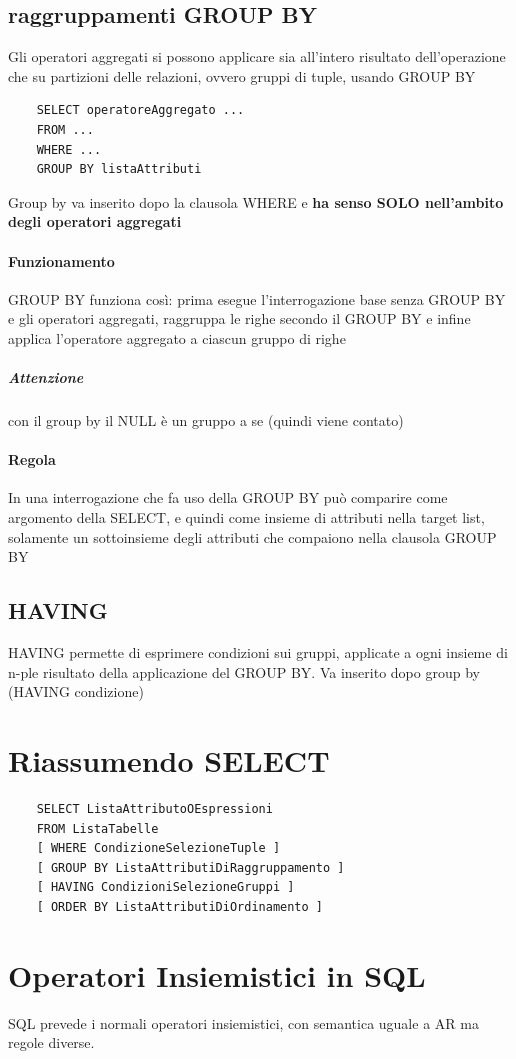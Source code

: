 \documentclass[12pt, a4paper, openany]{book}
\begin{document}
\subsection{raggruppamenti GROUP BY}
Gli operatori aggregati si possono applicare sia all'intero risultato dell'operazione che su partizioni delle relazioni, ovvero gruppi di tuple, usando GROUP BY 
\begin{verbatim}
    SELECT operatoreAggregato ...
    FROM ...
    WHERE ... 
    GROUP BY listaAttributi
\end{verbatim}
Group by va inserito dopo la clausola WHERE e \textbf{ha senso SOLO nell'ambito degli operatori aggregati}
\paragraph{Funzionamento} GROUP BY funziona così: prima esegue l'interrogazione base senza GROUP BY e gli operatori aggregati, raggruppa le righe secondo il GROUP BY e infine applica l'operatore aggregato a ciascun gruppo di righe
\subparagraph{Attenzione} con il group by il NULL è un gruppo a se (quindi viene contato)
\paragraph{Regola} In una interrogazione che fa uso della GROUP BY può comparire come argomento della SELECT, e quindi come insieme di attributi nella target list, solamente un sottoinsieme degli attributi che compaiono nella clausola GROUP BY

\subsection*{HAVING}
HAVING permette di esprimere condizioni sui gruppi, applicate a ogni insieme di n-ple risultato della applicazione del GROUP BY. Va inserito dopo group by (HAVING condizione) 


\section{Riassumendo SELECT}
\begin{verbatim}
    SELECT ListaAttributoOEspressioni
    FROM ListaTabelle
    [ WHERE CondizioneSelezioneTuple ]
    [ GROUP BY ListaAttributiDiRaggruppamento ]
    [ HAVING CondizioniSelezioneGruppi ]
    [ ORDER BY ListaAttributiDiOrdinamento ]
\end{verbatim}

\section{Operatori Insiemistici in SQL}
SQL prevede i normali operatori insiemistici, con semantica uguale a AR ma regole diverse.
\end{document}
